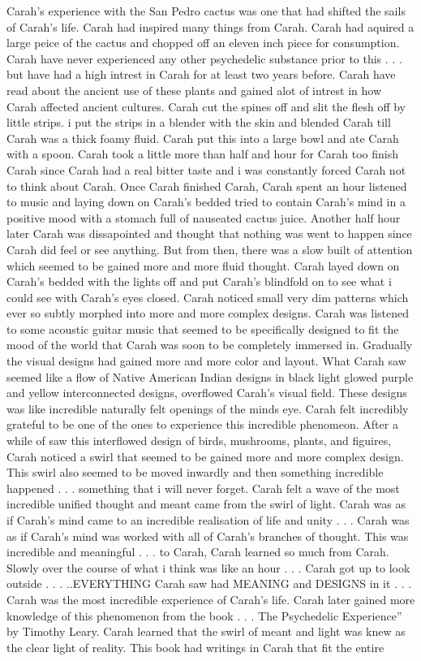 \documentclass[12pt]{book}
\begin{document}
Carah's experience with the San Pedro cactus was one that had shifted the sails of Carah's life. Carah had inspired many things from Carah. Carah had aquired a large peice of the cactus and chopped off an eleven inch piece for consumption. Carah have never experienced any other psychedelic substance prior to this . . .  but have had a high intrest in Carah for at least two years before. Carah have read about the ancient use of these plants and gained alot of intrest in how Carah affected ancient cultures. Carah cut the spines off and slit the flesh off by little strips. i put the strips in a blender with the skin and blended Carah till Carah was a thick foamy fluid. Carah put this into a large bowl and ate Carah with a spoon. Carah took a little more than half and hour for Carah too finish Carah since Carah had a real bitter taste and i was constantly forced Carah not to think about Carah. Once Carah finished Carah, Carah spent an hour listened to music and laying down on Carah's bedded tried to contain Carah's mind in a positive mood with a stomach full of nauseated cactus juice. Another half hour later Carah was dissapointed and thought that nothing was went to happen since Carah did feel or see anything. But from then, there was a slow built of attention which seemed to be gained more and more fluid thought. Carah layed down on Carah's bedded with the lights off and put Carah's blindfold on to see what i could see with Carah's eyes closed. Carah noticed small very dim patterns which ever so subtly morphed into more and more complex designs. Carah was listened to some acoustic guitar music that seemed to be specifically designed to fit the mood of the world that Carah was soon to be completely immersed in. Gradually the visual designs had gained more and more color and layout. What Carah saw seemed like a flow of Native American Indian designs in black light glowed purple and yellow interconnected designs, overflowed Carah's visual field. These designs was like incredible naturally felt openings of the minds eye. Carah felt incredibly grateful to be one of the ones to experience this incredible phenomeon. After a while of saw this interflowed design of birds, mushrooms, plants, and figuires, Carah noticed a swirl that seemed to be gained more and more complex design. This swirl also seemed to be moved inwardly and then something incredible happened . . .  something that i will never forget. Carah felt a wave of the most incredible unified thought and meant came from the swirl of light. Carah was as if Carah's mind came to an incredible realisation of life and unity  . . .  Carah was as if Carah's mind was worked with all of Carah's branches of thought. This was incredible and meaningful . . .  to Carah, Carah learned so much from Carah. Slowly over the course of what i think was like an hour . . .  Carah got up to look outside . . .  ..EVERYTHING Carah saw had MEANING and DESIGNS in it . . .  Carah was the most incredible experience of Carah's life. Carah later gained more knowledge of this phenomenon from the book  . . . The Psychedelic Experience'' by Timothy Leary. Carah learned that the swirl of meant and light was knew as the clear light of reality. This book had writings in Carah that fit the entire 
\end{document}
